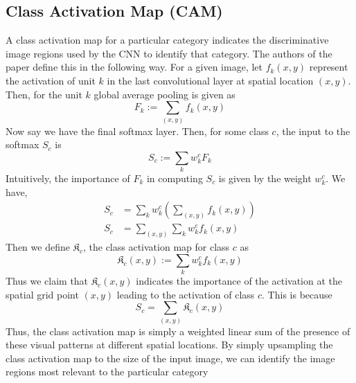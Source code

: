 \subsection{Class Activation Map (CAM)}
A class activation map for a particular category indicates the discriminative image regions used by the CNN to identify that category. The authors of the paper \cite{CAM} define this in the following way. For a given image, let $f_k(x,y)$ represent the activation of unit $k$ in the last convolutional layer at spatial location $(x,y)$. Then, for the unit $k$ global average pooling is given as \[F_k := \sum_{(x,y)}f_k(x,y)\]
Now say we have the final softmax layer. Then, for some class $c$, the input to the softmax $S_c$ is 
\[S_c := \sum_k w_k^cF_k\]
Intuitively, the importance of $F_k$ in computing $S_c$ is given by the weight $w_k^c$. We have,
\begin{align}
S_c &= \sum_kw_k^c\left(\sum_{(x,y)}f_k(x,y)\right) \\ 
S_c &= \sum_{(x,y)}\sum_kw_k^cf_k(x,y) 
\end{align}
Then we define $\mathfrak{K}_c$, the class activation map for class $c$ as
\[\mathfrak{K}_c(x,y) := \sum_kw_k^cf_k(x,y)\]
Thus we claim that $\mathfrak{K}_c(x,y)$ indicates the importance of the activation at the spatial grid point $(x,y)$ leading to the activation of class $c$. This is because
\[S_c = \sum_{(x,y)}\mathfrak{K}_c(x,y)\]
Thus, the class activation map is simply a weighted linear sum of the presence of these visual patterns at different spatial locations. By simply upsampling the class activation map to the size of the input image, we can identify the image regions most relevant to the particular category
    